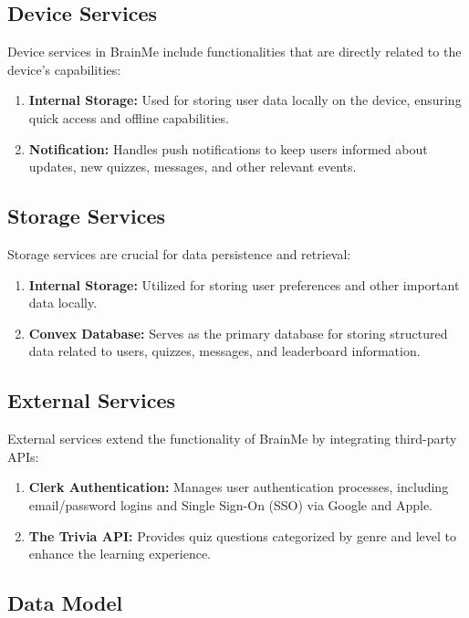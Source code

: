 \subsection{Device Services}

Device services in BrainMe include functionalities that are directly related to the device's capabilities:
\begin{enumerate}
\item \textbf{Internal Storage:} Used for storing user data locally on the device, ensuring quick access and offline capabilities.
\item \textbf{Notification:} Handles push notifications to keep users informed about updates, new quizzes, messages, and other relevant events.
\end{enumerate}

\subsection{Storage Services}

Storage services are crucial for data persistence and retrieval:
\begin{enumerate}
\item \textbf{Internal Storage:} Utilized for storing user preferences and other important data locally.
\item \textbf{Convex Database:} Serves as the primary database for storing structured data related to users, quizzes, messages, and leaderboard information.
\end{enumerate}

\subsection{External Services}

External services extend the functionality of BrainMe by integrating third-party APIs:
\begin{enumerate}
\item \textbf{Clerk Authentication:} Manages user authentication processes, including email/password logins and Single Sign-On (SSO) via Google and Apple.
\item \textbf{The Trivia API:} Provides quiz questions categorized by genre and level to enhance the learning experience.
\end{enumerate}

\subsection{Data Model}

